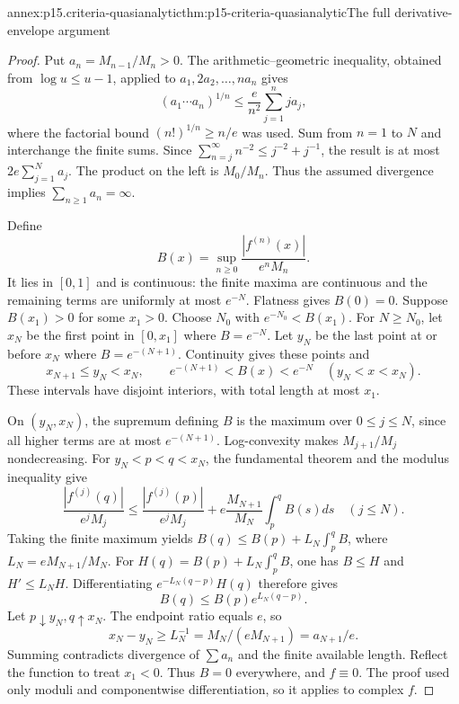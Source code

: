 \begin{annexitem}{annex:p15.criteria-quasianalytic}{thm:p15-criteria-quasianalytic}{The full derivative-envelope argument}
\begin{proof}
Put \(a_n=M_{n-1}/M_n>0\).
The arithmetic--geometric inequality, obtained
from \(\log u\leq u-1\), applied to
\(a_1,2a_2,\ldots,na_n\) gives
\[
 (a_1\cdots a_n)^{1/n}
       \leq\frac{e}{n^2}\sum_{j=1}^n ja_j,
\]
where the factorial bound
\((n!)^{1/n}\geq n/e\) was used.
Sum from \(n=1\) to \(N\) and interchange
the finite sums. Since
\(\sum_{n=j}^\infty n^{-2}\leq j^{-2}+j^{-1}\),
the result is at most \(2e\sum_{j=1}^N a_j\).
The product on the left is \(M_0/M_n\).
Thus the assumed divergence implies
\(\sum_{n\geq1}a_n=\infty\).

Define
\[
 B(x)=\sup_{n\geq0}\frac{|f^{(n)}(x)|}{e^nM_n}.
\]
It lies in \([0,1]\) and is continuous:
the finite maxima are continuous and the
remaining terms are uniformly at most \(e^{-N}\).
Flatness gives \(B(0)=0\).
Suppose \(B(x_1)>0\) for some \(x_1>0\).
Choose \(N_0\) with \(e^{-N_0}<B(x_1)\).
For \(N\geq N_0\), let \(x_N\) be the first
point in \([0,x_1]\) where \(B=e^{-N}\).
Let \(y_N\) be the last point at or before
\(x_N\) where \(B=e^{-(N+1)}\).
Continuity gives these points and
\[
 x_{N+1}\leq y_N<x_N,\qquad
 e^{-(N+1)}<B(x)<e^{-N}\quad(y_N<x<x_N).
\]
These intervals have disjoint interiors,
with total length at most \(x_1\).

On \((y_N,x_N)\), the supremum defining \(B\)
is the maximum over \(0\leq j\leq N\),
since all higher terms are at most \(e^{-(N+1)}\).
Log-convexity makes \(M_{j+1}/M_j\)
nondecreasing. For \(y_N<p<q<x_N\), the
fundamental theorem and the modulus inequality give
\[
 \frac{|f^{(j)}(q)|}{e^jM_j}
 \leq\frac{|f^{(j)}(p)|}{e^jM_j}
       +e\frac{M_{N+1}}{M_N}\int_p^q B(s)ds
                                    \quad(j\leq N).
\]
Taking the finite maximum yields
\(B(q)\leq B(p)+L_N\int_p^q B\), where
\(L_N=eM_{N+1}/M_N\).
For \(H(q)=B(p)+L_N\int_p^q B\), one has
\(B\leq H\) and \(H'\leq L_NH\).
Differentiating \(e^{-L_N(q-p)}H(q)\) therefore gives
\[
 B(q)\leq B(p)e^{L_N(q-p)}.
\]
Let \(p\downarrow y_N,q\uparrow x_N\).
The endpoint ratio equals \(e\), so
\[
 x_N-y_N\geq L_N^{-1}
                   =M_N/(eM_{N+1})=a_{N+1}/e.
\]
Summing contradicts divergence of \(\sum a_n\)
and the finite available length.
Reflect the function to treat \(x_1<0\).
Thus \(B=0\) everywhere, and \(f\equiv0\).
The proof used only moduli and componentwise
differentiation, so it applies to complex \(f\).
\end{proof}
\end{annexitem}

